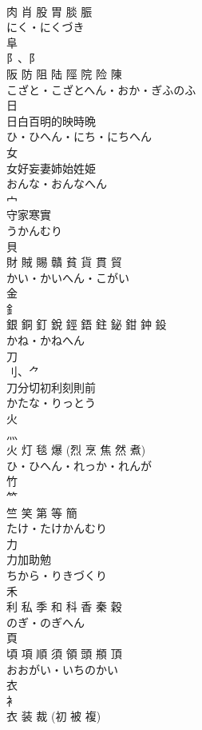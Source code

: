 \documentclass[8pt]{extreport}
\begin{document}
\begin{CJK}{UTF8}{min}
\\	肉 肖 股 胃 腅 脤	
\\	にく・にくづき	
\\	阜	
\\	阝、⻖ 
\\	阪 防 阻 陆 陘 院 险 陳	
\\	こざと・こざとへん・おか・ぎふのふ	
\\	日	
\\	日白百明的映時晩	
\\	ひ・ひへん・にち・にちへん	
\\	女	
\\	女好妄妻姉始姓姫	
\\	おんな・おんなへん	
\\	宀	
\\	守家寒實	
\\	うかんむり	
\\	貝	
\\	財 賊 賜 贛 貧 貨 貫 貿	
\\	かい・かいへん・こがい	
\\	金	
\\	釒 
\\	銀 銅 釘 銳 鋞 鋙 鉒 鉍 鉗 鈡 鈠	
\\	かね・かねへん	
\\	刀	
\\	刂、⺈ 
\\	刀分切初利刻則前	
\\	かたな・りっとう	
\\	火	
\\	灬 
\\	火 灯 毯 爆 (烈 烹 焦 然 煮)	
\\	ひ・ひへん・れっか・れんが	
\\	竹	
\\	⺮ 
\\	竺 笑 第 等 簡	
\\	たけ・たけかんむり	
\\	力	
\\	力加助勉	
\\	ちから・りきづくり	
\\	禾	
\\	利 私 季 和 科 香 秦 穀	
\\	のぎ・のぎへん	
\\	頁	
\\	頃 項 順 須 領 頭 頩 頂	
\\	おおがい・いちのかい	
\\	衣	
\\	衤 
\\	衣 装 裁 (初 被 複)	

\end{CJK}
\end{document}
